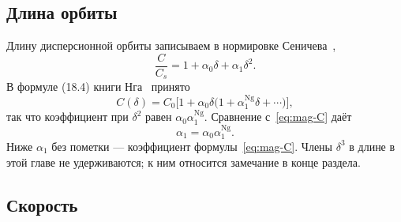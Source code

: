 \documentclass[aps,pra,preprint,a4paper,amsmath,amssymb,longbibliography]{revtex4-2}
\begin{document}
\subsection{Длина орбиты}
\label{sec:length}

Длину дисперсионной орбиты записываем в нормировке Сеничева~\cite{Senichev2013},
\begin{equation}
\label{eq:mag-C}
\frac{C}{C_s}=1+\alpha_0\delta+\alpha_1\delta^2.
\end{equation}
В формуле (18.4) книги Нга~\cite{Ng2006} принято
\begin{equation}
\label{eq:mag-Cng}
C(\delta)=C_0\bigl[1+\alpha_0\delta\bigl(1+\alpha_1^{\mathrm{Ng}}\delta+\cdots\bigr)\bigr],
\end{equation}
так что коэффициент при $\delta^2$ равен $\alpha_0\alpha_1^{\mathrm{Ng}}$. Сравнение с~\eqref{eq:mag-C} даёт
\begin{equation}
\label{eq:mag-alpha-ng}
\alpha_1=\alpha_0\alpha_1^{\mathrm{Ng}}.
\end{equation}
Ниже $\alpha_1$ без пометки --- коэффициент формулы~\eqref{eq:mag-C}. Члены $\delta^3$ в длине в этой главе не удерживаются; к ним относится замечание в конце раздела.

\subsection{Скорость}
\label{sec:velocity}
\end{document}
